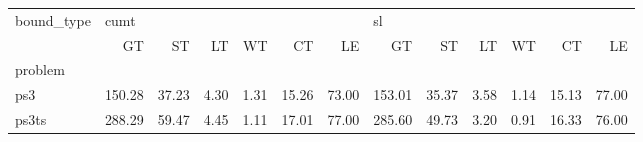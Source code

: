 \begin{tabular}{lrrrrrrrrrrrr}
\toprule
bound\_type & \multicolumn{6}{l}{cumt} & \multicolumn{6}{l}{sl} \\
{} &     GT &    ST &   LT &   WT &    CT &    LE &     GT &    ST &   LT &   WT &    CT &    LE \\
problem &        &       &      &      &       &       &        &       &      &      &       &       \\
\midrule
ps3     & 150.28 & 37.23 & 4.30 & 1.31 & 15.26 & 73.00 & 153.01 & 35.37 & 3.58 & 1.14 & 15.13 & 77.00 \\
ps3ts   & 288.29 & 59.47 & 4.45 & 1.11 & 17.01 & 77.00 & 285.60 & 49.73 & 3.20 & 0.91 & 16.33 & 76.00 \\
\bottomrule
\end{tabular}

